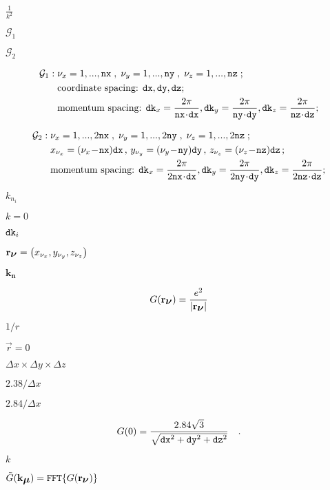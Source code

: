 \documentclass{article}
\begin{document}
$\frac{1}{k^2}$
\pagebreak

$\mathcal{G}_1$
\pagebreak

$\mathcal{G}_2$
\pagebreak

\begin{eqnarray*} \mathcal{G}_1:\;& \nu_x=1,...,{\tt nx}\;,\; \nu_y=1,...,{\tt ny}\;,\; \nu_z=1,...,{\tt nz}\;;\; \\& \mbox{coordinate spacing: } {\tt dx}, {\tt dy}, {\tt dz}; \\& \mbox{momentum spacing: } {\tt dk}_x = \frac{2\pi}{{\tt nx}\!\cdot\!{\tt dx}}, {\tt dk}_y = \frac{2\pi}{{\tt ny}\!\cdot\!{\tt dy}}, {\tt dk}_z = \frac{2\pi}{{\tt nz}\!\cdot\!{\tt dz}}; \end{eqnarray*}
\pagebreak

\begin{eqnarray*} \mathcal{G}_2:\;& \nu_x=1,...,2{\tt nx}\;,\; \nu_y=1,...,2{\tt ny}\;,\; \nu_z=1,...,2{\tt nz}\;;\; \\& x_{\nu_x}=(\nu_x\!-\!{\tt nx}){\tt dx}\,,\, y_{\nu_y}=(\nu_y\!-\!{\tt ny}){\tt dy}\,,\, z_{\nu_z}=(\nu_z\!-\!{\tt nz}){\tt dz}\,; \\& \mbox{momentum spacing: } {\tt dk}_x = \frac{2\pi}{{2\tt nx}\!\cdot\!{\tt dx}}, {\tt dk}_y = \frac{2\pi}{{2\tt ny}\!\cdot\!{\tt dy}}, {\tt dk}_z = \frac{2\pi}{{2\tt nz}\!\cdot\!{\tt dz}}; \end{eqnarray*}
\pagebreak

$k_{n_i}$
\pagebreak

$k=0$
\pagebreak

${\tt dk}_i$
\pagebreak

$\mathbf{r}_{\mbox{\boldmath$\nu$}}=\left(x_{\nu_x},y_{\nu_y},z_{\nu_z}\right)$
\pagebreak

$\mathbf{k}_\mathbf{n}$
\pagebreak

\[ G(\mathbf{r}_{\mbox{\boldmath$\nu$}})=\frac{e^2}{|\mathbf{r}_{\mbox{\boldmath$\nu$}}|} \]
\pagebreak

$ 1/r $
\pagebreak

$ \vec r=0 $
\pagebreak

$\Delta x\times\Delta y\times\Delta z $
\pagebreak

$ 2.38/\Delta x $
\pagebreak

$ 2.84/\Delta x $
\pagebreak

\[ G(0) = \frac{2.84\sqrt{3}}{\sqrt{{\tt dx}^2+{\tt dy}^2+{\tt dz}^2}} \quad.\]
\pagebreak

$ k $
\pagebreak

$\tilde{G}(\mathbf{k}_{\mbox{\boldmath$\mu$}})={\tt FFT}\{G(\mathbf{r}_{\mbox{\boldmath$\nu$}})\}$
\pagebreak
\end{document}
